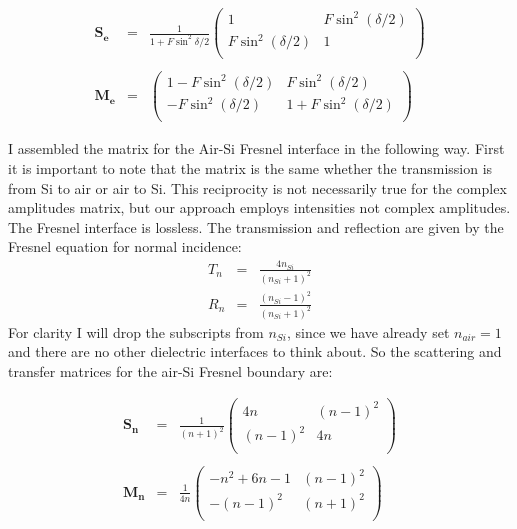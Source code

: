 \documentclass[osajnl,preprint,showpacs,superscriptaddress,12pt]{revtex4-1} %
\begin{document}
\begin{eqnarray}
\boldsymbol{S_e}&=&\frac{1}{1+F\sin^2{\delta/2}} \left(
\begin{array}{cc}
1 & F \sin ^2(\delta/2) \\
F \sin ^2(\delta/2) & 1 \\
\end{array}
\right) \nonumber \\
\nonumber \\
\boldsymbol{M_e}&=&\left(
\begin{array}{cc}
 1-F \sin ^2(\delta/2) & F \sin ^2(\delta/2) \\
 -F \sin ^2(\delta/2) & 1+F \sin ^2(\delta/2) \\
\end{array}
\right)
\label{eqn:EtalonMatrix}
\end{eqnarray}

I assembled the matrix for the Air-Si Fresnel interface in the following way.  First it is important to note that the matrix is the same whether the transmission is from Si to air or air to Si.  This reciprocity is not necessarily true for the complex amplitudes matrix, but our approach employs intensities not complex amplitudes.  The Fresnel interface is lossless.  The transmission and reflection are given by the Fresnel equation for normal incidence:
\begin{eqnarray}
T_n&=&\frac{4n_{Si}}{(n_{Si}+1)^2} \\
R_n&=&\frac{(n_{Si}-1)^2}{(n_{Si}+1)^2} \label{eq:FresnelTrans}
\end{eqnarray}
For clarity I will drop the subscripts from $n_{Si}$, since we have already set $n_{air}=1$ and there are no other dielectric interfaces to think about.  So the scattering and transfer matrices for the air-Si Fresnel boundary are:

\begin{eqnarray}
\boldsymbol{S_n}&=&\frac{1}{(n+1)^2} \left(
\begin{array}{cc}
4n & (n-1)^2 \\
(n-1)^2 & 4n \\
\end{array}
\right)  \nonumber \\
\nonumber \\
\boldsymbol{M_n}&=&\frac{1}{4n}\left(
\begin{array}{cc}
 -n^2+6  n-1 & ( n-1)^2 \\
 -( n-1)^2 & ( n+1)^2 \\
\end{array}
\right)
\label{eqn:SiAirMatrix}
\end{eqnarray}
\end{document}
